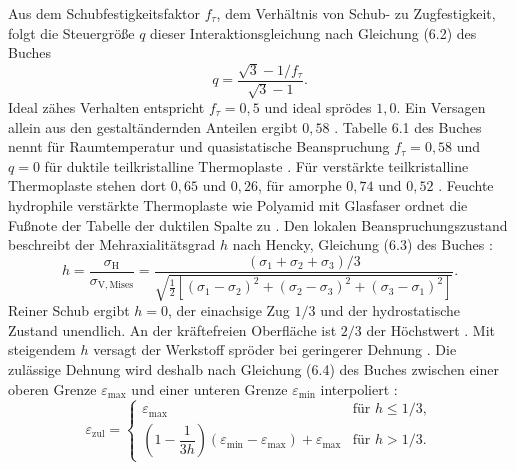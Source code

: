 Aus dem Schubfestigkeitsfaktor $f_{\tau}$, dem Verhältnis von Schub- zu Zugfestigkeit, folgt die Steuergröße $q$ dieser Interaktionsgleichung nach Gleichung (6.2) des Buches \cite[S.~322]{Sto18}
\begin{equation}
    q = \frac{\sqrt{3} - 1/f_{\tau}}{\sqrt{3} - 1} .
    \label{eq:q_ftau}
\end{equation}
Ideal zähes Verhalten entspricht $f_{\tau} = 0{,}5$ und ideal sprödes $1{,}0$. Ein Versagen allein aus den gestaltändernden Anteilen ergibt $0{,}58$ \cite[S.~323]{Sto18}. Tabelle 6.1 des Buches nennt für Raumtemperatur und quasistatische Beanspruchung $f_{\tau} = 0{,}58$ und $q = 0$ für duktile teilkristalline Thermoplaste \cite[S.~323]{Sto18}. Für verstärkte teilkristalline Thermoplaste stehen dort $0{,}65$ und $0{,}26$, für amorphe $0{,}74$ und $0{,}52$ \cite[S.~323]{Sto18}. Feuchte hydrophile verstärkte Thermoplaste wie Polyamid mit Glasfaser ordnet die Fußnote der Tabelle der duktilen Spalte zu \cite[S.~323]{Sto18}. Den lokalen Beanspruchungszustand beschreibt der Mehraxialitätsgrad $h$ nach Hencky, Gleichung (6.3) des Buches \cite[S.~325]{Sto18}:
\begin{equation}
    h = \frac{\sigma_{\mathrm{H}}}{\sigma_{\mathrm{V,Mises}}} = \frac{(\sigma_{1} + \sigma_{2} + \sigma_{3})/3}{\sqrt{\tfrac{1}{2}\left[(\sigma_{1} - \sigma_{2})^{2} + (\sigma_{2} - \sigma_{3})^{2} + (\sigma_{3} - \sigma_{1})^{2}\right]}} .
    \label{eq:h_hencky}
\end{equation}
Reiner Schub ergibt $h = 0$, der einachsige Zug $1/3$ und der hydrostatische Zustand unendlich. An der kräftefreien Oberfläche ist $2/3$ der Höchstwert \cite[S.~325]{Sto18}. Mit steigendem $h$ versagt der Werkstoff spröder bei geringerer Dehnung \cite[S.~324 bis 325]{Sto18}. Die zulässige Dehnung wird deshalb nach Gleichung (6.4) des Buches zwischen einer oberen Grenze $\varepsilon_{\mathrm{max}}$ und einer unteren Grenze $\varepsilon_{\mathrm{min}}$ interpoliert \cite[S.~326]{Sto18}:
\begin{equation}
    \varepsilon_{\mathrm{zul}} =
    \begin{cases}
        \varepsilon_{\mathrm{max}}                                                                                                      & \text{für } h \leq 1/3 , \\[4pt]
        \left(1 - \dfrac{1}{3h}\right)\left(\varepsilon_{\mathrm{min}} - \varepsilon_{\mathrm{max}}\right) + \varepsilon_{\mathrm{max}} & \text{für } h > 1/3 .
    \end{cases}
    \label{eq:eps_zul}
\end{equation}
